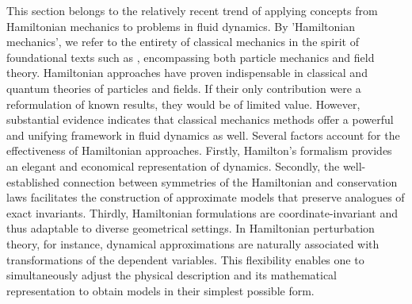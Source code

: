 \documentclass[alpha-refs, 12pt]{wiley-article}
\begin{document}
This section belongs to the relatively recent trend of applying concepts from Hamiltonian mechanics to problems in fluid dynamics. By 'Hamiltonian mechanics', we refer to the entirety of classical mechanics in the spirit of foundational texts such as \cite{Lanczos1970, Goldstein2001,Arnold1997}, encompassing both particle mechanics and field theory. Hamiltonian approaches have proven indispensable in classical and quantum theories of particles and fields. If their only contribution were a reformulation of known results, they would be of limited value. However, substantial evidence indicates that classical mechanics methods offer a powerful and unifying framework in fluid dynamics as well. Several factors account for the effectiveness of Hamiltonian approaches. Firstly, Hamilton's formalism provides an elegant and economical representation of dynamics. Secondly, the well-established connection between symmetries of the Hamiltonian and conservation laws facilitates the construction of approximate models that preserve analogues of exact invariants. Thirdly, Hamiltonian formulations are coordinate-invariant and thus adaptable to diverse geometrical settings. In Hamiltonian perturbation theory, for instance, dynamical approximations are naturally associated with transformations of the dependent variables. This flexibility enables one to simultaneously adjust the physical description and its mathematical representation to obtain models in their simplest possible form.
\end{document}
